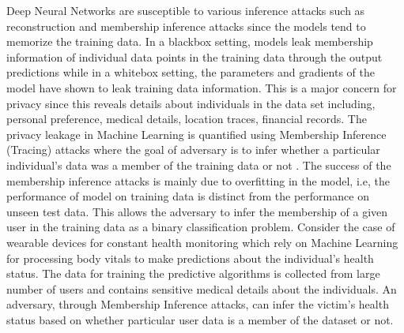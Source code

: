 Deep Neural Networks are susceptible to various inference attacks such as reconstruction and membership inference attacks since the models tend to memorize the training data.
In a blackbox setting, models leak membership information of individual data points in the training data through the output predictions while in a whitebox setting, the parameters and gradients of the model have shown to leak training data information.
This is a major concern for privacy since this reveals details about individuals in the data set including, personal preference, medical details, location traces, financial records.
The privacy leakage in Machine Learning is quantified using Membership Inference (Tracing) attacks where the goal of adversary is to infer whether a particular individual's data was a member of the training data or not \cite{shokri2017membership}.
The success of the membership inference attacks is mainly due to overfitting in the model, i.e, the performance of model on training data is distinct from the performance on unseen test data.
This allows the adversary to infer the membership of a given user in the training data as a binary classification problem.
Consider the case of wearable devices for constant health monitoring which rely on Machine Learning for processing body vitals to make predictions about the individual's health status.
The data for training the predictive algorithms is collected from large number of users and contains sensitive medical details about the individuals.
An adversary, through Membership Inference attacks, can infer the victim's health status based on whether particular user data is a member of the dataset or not.

